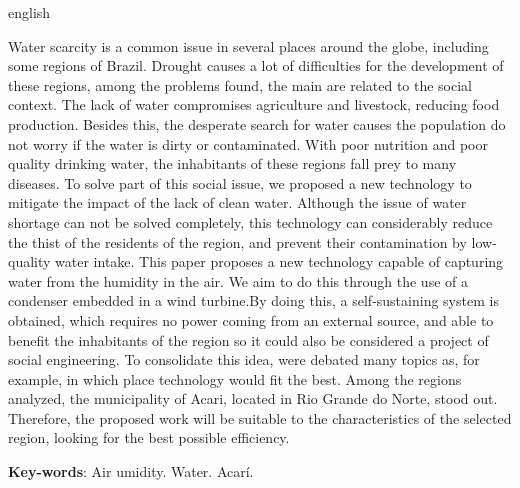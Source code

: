 \begin{resumo}[Abstract]
 \begin{otherlanguage*}{english}
   
   Water scarcity is a common issue in several places around the globe, including some regions of Brazil.
   Drought causes a lot of difficulties for the development of these regions, among the problems found, the main are related
   to the social context. The lack of water compromises agriculture and livestock, reducing food production.
   Besides this, the desperate search for water causes the population do not worry if the water is dirty or contaminated.
   With poor nutrition and poor quality drinking water, the inhabitants of these regions fall prey to many diseases.
   To solve part of this social issue, we proposed a new technology to mitigate the impact of the lack of clean water.
   Although the issue of water shortage can not be solved completely, this technology can considerably reduce the thist
   of the residents of the region, and prevent their contamination by low-quality water intake.
   This paper proposes a new technology capable of capturing water from the humidity in the air.
   We aim to do this through the use of a condenser embedded in a wind turbine.By doing this, a self-sustaining system
   is obtained, which requires no power coming from an external source, and able to benefit the inhabitants of the region
   so it could also be considered a project of social engineering. To consolidate this idea, were debated many topics as,
   for example, in which place technology would fit the best. Among the regions analyzed, the municipality of Acari,
   located in Rio Grande do Norte, stood out. Therefore, the proposed work will be suitable to the characteristics of the
   selected region, looking for the best possible efficiency.
   
   \vspace{\onelineskip}
 
   \noindent 
   \textbf{Key-words}: Air umidity. Water. Acarí.
 \end{otherlanguage*}
\end{resumo}
